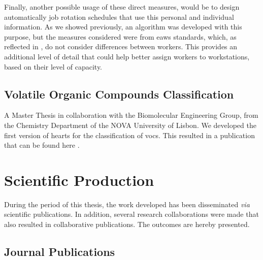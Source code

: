 \par
Finally, another possible usage of these direct measures, would be to design automatically job rotation schedules that use this personal and individual information. As we showed previously, an algorithm was developed with this purpose, but the measures considered were from \gls{eaws} standards, which, as reflected in \cite{sara}, do not consider differences between workers. This provides an additional level of detail that could help better assign workers to workstations, based on their level of capacity.

\subsection{Volatile Organic Compounds Classification}

A Master Thesis in collaboration with the Biomolecular Engineering Group, from the Chemistry Department of the NOVA University of Lisbon. We developed the first version of \gls{hearts} for the classification of \gls{voc}s. This resulted in a publication that can be found here \cite{class_voc}.

\section{Scientific Production}

During the period of this thesis, the work developed has been disseminated \textit{via} scientific publications. In addition, several research collaborations were made that also resulted in collaborative publications. The outcomes are hereby presented.

\subsection{Journal Publications}

